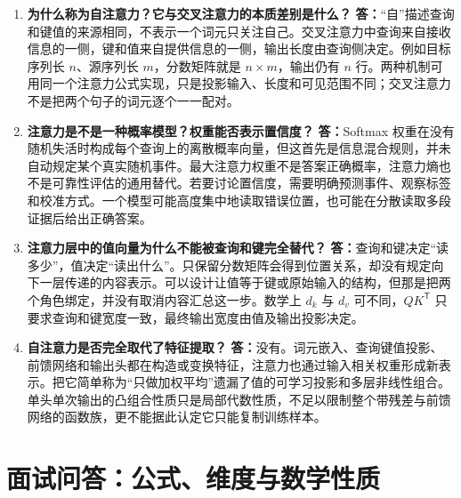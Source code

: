 \documentclass[UTF8,12pt,a4paper,fontset=fandol]{ctexart}
\begin{document}
\begin{enumerate}[label=\arabic*.,series=trquestions]
\item \textbf{为什么称为自注意力？它与交叉注意力的本质差别是什么？}
\textbf{答：}“自”描述查询和键值的来源相同，不表示一个词元只关注自己。交叉注意力中查询来自接收信息的一侧，键和值来自提供信息的一侧，输出长度由查询侧决定。例如目标序列长 $n$、源序列长 $m$，分数矩阵就是 $n\times m$，输出仍有 $n$ 行。两种机制可用同一个注意力公式实现，只是投影输入、长度和可见范围不同；交叉注意力不是把两个句子的词元逐个一一配对。

\item \textbf{注意力是不是一种概率模型？权重能否表示置信度？}
\textbf{答：}Softmax 权重在没有随机失活时构成每个查询上的离散概率向量，但这首先是信息混合规则，并未自动规定某个真实随机事件。最大注意力权重不是答案正确概率，注意力熵也不是可靠性评估的通用替代。若要讨论置信度，需要明确预测事件、观察标签和校准方式。一个模型可能高度集中地读取错误位置，也可能在分散读取多段证据后给出正确答案。

\item \textbf{注意力层中的值向量为什么不能被查询和键完全替代？}
\textbf{答：}查询和键决定“读多少”，值决定“读出什么”。只保留分数矩阵会得到位置关系，却没有规定向下一层传递的内容表示。可以设计让值等于键或原始输入的结构，但那是把两个角色绑定，并没有取消内容汇总这一步。数学上 $d_k$ 与 $d_v$ 可不同，$QK^{\mathsf T}$ 只要求查询和键宽度一致，最终输出宽度由值及输出投影决定。

\item \textbf{自注意力是否完全取代了特征提取？}
\textbf{答：}没有。词元嵌入、查询键值投影、前馈网络和输出头都在构造或变换特征，注意力也通过输入相关权重形成新表示。把它简单称为“只做加权平均”遗漏了值的可学习投影和多层非线性组合。单头单次输出的凸组合性质只是局部代数性质，不足以限制整个带残差与前馈网络的函数族，更不能据此认定它只能复制训练样本。
\end{enumerate}

\section{面试问答：公式、维度与数学性质}
\label{sec:tr-qa-math}
\end{document}
